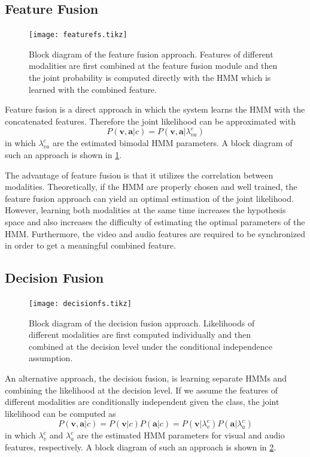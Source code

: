 \documentclass[letterpaper, 10 pt, conference]{ieeeconf}
\begin{document}
\subsection{Feature Fusion}
\begin{figure}[t]
  \footnotesize
  \centering
  \texttt{[image: featurefs.tikz]}
  \caption[Block diagram of the feature fusion approach.]{Block diagram of the feature fusion approach. Features of different modalities are first combined at the feature fusion module and then the joint probability is computed directly with the HMM which is learned with the combined feature.}
  \label{fig:featuref}
\end{figure}

Feature fusion is a direct approach in which the system learns the HMM with the concatenated features. Therefore the joint likelihood can be approximated with
\begin{equation}
  P(\mathbf{v},\mathbf{a}|c) = P(\mathbf{v},\mathbf{a}|\lambda_{va}^c)
\end{equation}
in which $\lambda_{va}^c$ are the estimated bimodal HMM parameters. A block diagram of such an approach is shown in \cref{fig:featuref}.

The advantage of feature fusion is that it utilizes the correlation between modalities. Theoretically, if the HMM are properly chosen and well trained, the feature fusion approach can yield an optimal estimation of the joint likelihood. However, learning both modalities at the same time increases the hypothesis space and also increases the difficulty of estimating the optimal parameters of the HMM. Furthermore, the video and audio features are required to be synchronized in order to get a meaningful combined feature.

\subsection{Decision Fusion}
\begin{figure}[t]
  \footnotesize
  \centering
  \texttt{[image: decisionfs.tikz]}
  \caption[Block diagram of the decision fusion approach.]{Block diagram of the decision fusion approach. Likelihoods of different modalities are first computed individually and then combined at the decision level under the conditional independence assumption.}
  \label{fig:decisionf}
\end{figure}

An alternative approach, the decision fusion, is learning separate HMMs and combining the likelihood at the decision level. If we assume the features of different modalities are conditionally independent given the class, the joint likelihood can be computed as
\begin{equation}
  P(\mathbf{v},\mathbf{a}|c) = P(\mathbf{v}|c) P(\mathbf{a}|c) = P(\mathbf{v}|\lambda_v^c) P(\mathbf{a}|\lambda_a^c)
\end{equation}
in which $\lambda_{v}^c$ and $\lambda_{a}^c$ are the estimated HMM parameters for visual and audio features, respectively. A block diagram of such an approach is shown in \cref{fig:decisionf}.
\end{document}
